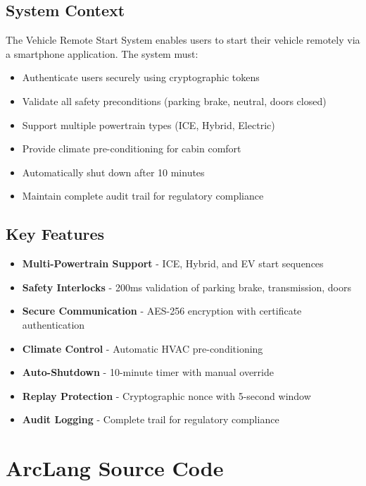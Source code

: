 \documentclass[11pt,a4paper]{article}
\begin{document}
\subsection{System Context}
The Vehicle Remote Start System enables users to start their vehicle remotely via a smartphone application. The system must:
\begin{itemize}[leftmargin=*]
    \item Authenticate users securely using cryptographic tokens
    \item Validate all safety preconditions (parking brake, neutral, doors closed)
    \item Support multiple powertrain types (ICE, Hybrid, Electric)
    \item Provide climate pre-conditioning for cabin comfort
    \item Automatically shut down after 10 minutes
    \item Maintain complete audit trail for regulatory compliance
\end{itemize}

\subsection{Key Features}
\begin{tcolorbox}[colback=arcgreen!5,colframe=arcgreen,title=System Capabilities]
\begin{itemize}[leftmargin=*]
    \item \textbf{Multi-Powertrain Support} - ICE, Hybrid, and EV start sequences
    \item \textbf{Safety Interlocks} - 200ms validation of parking brake, transmission, doors
    \item \textbf{Secure Communication} - AES-256 encryption with certificate authentication
    \item \textbf{Climate Control} - Automatic HVAC pre-conditioning
    \item \textbf{Auto-Shutdown} - 10-minute timer with manual override
    \item \textbf{Replay Protection} - Cryptographic nonce with 5-second window
    \item \textbf{Audit Logging} - Complete trail for regulatory compliance
\end{itemize}
\end{tcolorbox}

\section{ArcLang Source Code}
\end{document}
